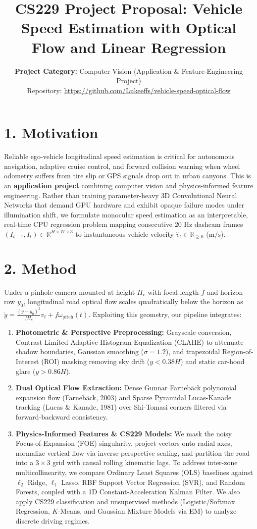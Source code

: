 \documentclass[11pt]{article}
\title{\vspace{-1.5em}\textbf{CS229 Project Proposal: Vehicle Speed Estimation with Optical Flow and Linear Regression}\vspace{-0.5em}}
\author{
  \textbf{Project Category:} Computer Vision (Application \& Feature-Engineering Project)\\
  Repository: \url{https://github.com/Lukeeffs/vehicle-speed-optical-flow}
}
\date{\vspace{-1.2em}}
\begin{document}
\maketitle

\section*{1. Motivation}
Reliable ego-vehicle longitudinal speed estimation is critical for autonomous navigation, adaptive cruise control, and forward collision warning when wheel odometry suffers from tire slip or GPS signals drop out in urban canyons. This is an \textbf{application project} combining computer vision and physics-informed feature engineering. Rather than training parameter-heavy 3D Convolutional Neural Networks that demand GPU hardware and exhibit opaque failure modes under illumination shift, we formulate monocular speed estimation as an interpretable, real-time CPU regression problem mapping consecutive $20\text{ Hz}$ dashcam frames $(I_{t-1}, I_t) \in \mathbb{R}^{H \times W \times 3}$ to instantaneous vehicle velocity $\hat{v}_t \in \mathbb{R}_{\ge 0}$ ($\text{m/s}$).

\section*{2. Method}
Under a pinhole camera mounted at height $H_c$ with focal length $f$ and horizon row $y_0$, longitudinal road optical flow scales quadratically below the horizon as $\dot{y} = \frac{(y - y_0)^2}{f H_c} v_t + f\omega_{\text{pitch}}(t)$. Exploiting this geometry, our pipeline integrates:
\begin{enumerate}
  \item \textbf{Photometric \& Perspective Preprocessing:} Grayscale conversion, Contrast-Limited Adaptive Histogram Equalization (CLAHE) to attenuate shadow boundaries, Gaussian smoothing ($\sigma = 1.2$), and trapezoidal Region-of-Interest (ROI) masking removing sky drift ($y < 0.38H$) and static car-hood glare ($y > 0.86H$).
  \item \textbf{Dual Optical Flow Extraction:} Dense Gunnar Farneb\"{a}ck polynomial expansion flow (Farneb\"{a}ck, 2003) and Sparse Pyramidal Lucas-Kanade tracking (Lucas \& Kanade, 1981) over Shi-Tomasi corners filtered via forward-backward consistency.
  \item \textbf{Physics-Informed Features \& CS229 Models:} We mask the noisy Focus-of-Expansion (FOE) singularity, project vectors onto radial axes, normalize vertical flow via inverse-perspective scaling, and partition the road into a $3 \times 3$ grid with causal rolling kinematic lags. To address inter-zone multicollinearity, we compare Ordinary Least Squares (OLS) baselines against $\ell_2$ Ridge, $\ell_1$ Lasso, RBF Support Vector Regression (SVR), and Random Forests, coupled with a 1D Constant-Acceleration Kalman Filter. We also apply CS229 classification and unsupervised methods (Logistic/Softmax Regression, $K$-Means, and Gaussian Mixture Models via EM) to analyze discrete driving regimes.
\end{enumerate}
\end{document}

